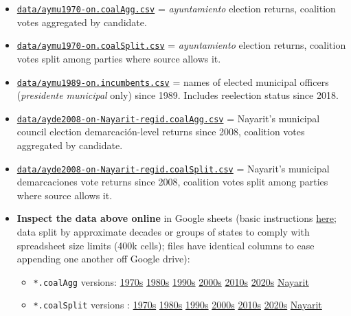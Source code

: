 \documentclass[11pt]{article}
\begin{document}
\begin{itemize}
\item \href{./data/aymu1989-present.coalAgg.csv}{\texttt{data/aymu1970-on.coalAgg.csv}} = \emph{ayuntamiento} election returns, coalition votes aggregated by candidate.
\item \href{./data/aymu1989-present.coalSplit.csv}{\texttt{data/aymu1970-on.coalSplit.csv}} = \emph{ayuntamiento} election returns, coalition votes split among parties where source allows it.
\item \href{./data/aymu1989-present.incumbents.csv}{\texttt{data/aymu1989-on.incumbents.csv}} = names of elected municipal officers (\emph{presidente municipal} only) since 1989. Includes reelection status since 2018.
\item \href{./data/ayde2008-on-Nayarit-regid.coalAgg.csv}{\texttt{data/ayde2008-on-Nayarit-regid.coalAgg.csv}} = Nayarit's municipal council election demarcación-level returns since 2008, coalition votes aggregated by candidate.
\item \href{./data/ayde2008-on-Nayarit-regid.coalSplit.csv}{\texttt{data/ayde2008-on-Nayarit-regid.coalSplit.csv}} = Nayarit's municipal demarcaciones vote returns since 2008, coalition votes split among parties where source allows it.
\item \textbf{Inspect the data above online} in Google sheets (basic instructions \hyperref[org0025864]{here}; data split by approximate decades or groups of states to comply with spreadsheet size limits (400k cells); files have identical columns to ease appending one another off Google drive):
\begin{itemize}
\item \texttt{*.coalAgg} versions: \href{https://docs.google.com/spreadsheets/d/10DjanWnuvGUqO8AFDb3yky8Pa7ciMhf\_MbthCmKCloI/copy}{1970s} \href{https://docs.google.com/spreadsheets/d/1hqAyWaewUKwA-CKgXgcg-p4aqPQxmuTbxmcKSQgjfDE/copy}{1980s} \href{https://docs.google.com/spreadsheets/d/1nwEO4u4ddn4kGlHUM9dc-ueD6L7IXXkLNHRBDPrB9Nk/copy}{1990s} \href{https://docs.google.com/spreadsheets/d/1WBmHm1yqgXO6qjj8czROZNcZNS\_G82Z-UT0vtTxSVFI/copy}{2000s} \href{https://docs.google.com/spreadsheets/d/1TgdTRdN5wqLPdV4j2CvvhvsXbFnMFMSho653XQHQsNs/copy}{2010s} \href{https://docs.google.com/spreadsheets/d/1jXzjWBfQrpFTHahXDW9i3nyFL0bjYqSeIMwS-CGA3KQ/copy}{2020s} \href{https://docs.google.com/spreadsheets/d/1buoVi7UlVPoApm7nan-ixb3ts8Sraj\_V86mK-3UeH3w/copy}{Nayarit}
\item \texttt{*.coalSplit} versions : \href{https://docs.google.com/spreadsheets/d/10xIcX83xTi-YI1PmdmdpTGpItBtwndOZILZZugdMpVo/copy}{1970s} \href{https://docs.google.com/spreadsheets/d/1yqCFBtr8Z2sCya7CT9LMPifU\_kA4wlqSTLjrW-KiALc/copy}{1980s} \href{https://docs.google.com/spreadsheets/d/1rE5KHwvuVglV0rLI70P4PgtOmWSiUGtS92G4QbN4zz0/copy}{1990s} \href{https://docs.google.com/spreadsheets/d/1GgG7SSeJptJ-uGmIgBck3mniL2HR1gn6efebBMlEpXQ/copy}{2000s} \href{https://docs.google.com/spreadsheets/d/1nKyNzZuLyDWxqIfC6MiRDmvzligGQ2v\_YrqppcEVa1Q/copy}{2010s} \href{https://docs.google.com/spreadsheets/d/1xg9GvjPzOq7TxxkkebMGuOBz50WU\_RVEaadLsIWRWHU/copy}{2020s} \href{https://docs.google.com/spreadsheets/d/1C2OvOsSBaOqMOj1KEV6F2dgq0fGBwLJJYSnvBKpmTkM/copy}{Nayarit}

\end{itemize}
\end{itemize}
\end{document}
